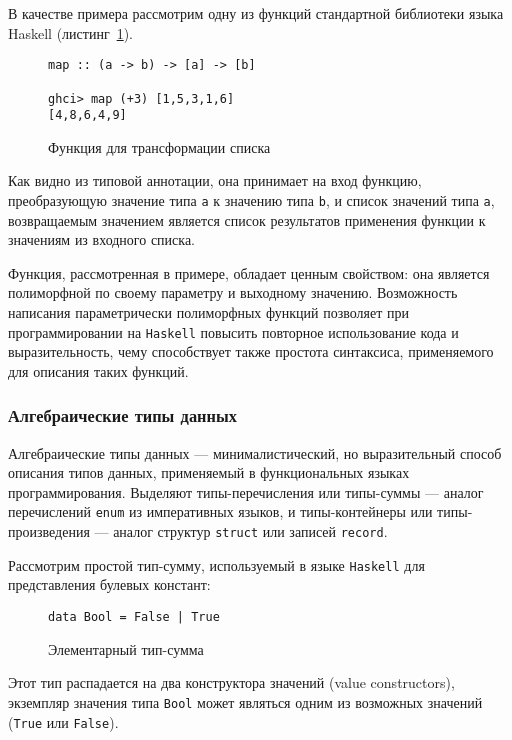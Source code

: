 В качестве примера рассмотрим одну из функций стандартной библиотеки языка Haskell (листинг~\ref{listing:map}). 
\begin{figure}[h]
\begin{lstlisting}
map :: (a -> b) -> [a] -> [b]

ghci> map (+3) [1,5,3,1,6]  
[4,8,6,4,9]
\end{lstlisting}
\caption{Функция для трансформации списка}
\label{listing:map}
\end{figure}

Как видно из типовой аннотации, она принимает на вход функцию, преобразующую значение типа \lstinline{a} к значению типа \lstinline{b}, и список значений типа \lstinline{a}, возвращаемым значением является список результатов применения функции к значениям из входного списка.

Функция, рассмотренная в примере, обладает ценным свойством: она является полиморфной по своему параметру и выходному значению. Возможность написания параметрически полиморфных функций позволяет при программировании на \lstinline{Haskell} повысить повторное использование кода и выразительность, чему способствует также простота синтаксиса, применяемого для описания таких функций.     

\subsubsection{Алгебраические типы данных}

Алгебраические типы данных --- минималистический, но выразительный способ описания типов данных, применяемый в функциональных языках программирования. Выделяют типы-перечисления или типы-суммы --- аналог перечислений \lstinline{enum} из императивных языков, и типы-контейнеры или типы-произведения --- аналог структур \lstinline{struct} или записей \lstinline{record}.


Рассмотрим простой тип-сумму, используемый в языке \lstinline{Haskell} для представления булевых констант: 

\begin{figure}[h]
\begin{lstlisting}
data Bool = False | True  
\end{lstlisting}
\caption{Элементарный тип-сумма}
\label{listing:Bool}
\end{figure}

Этот тип распадается на два конструктора значений (value constructors), экземпляр значения типа \lstinline{Bool} может являться одним из возможных значений (\lstinline{True} или \lstinline{False}).


